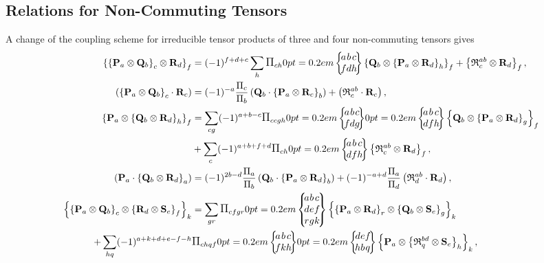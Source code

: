 \subsection{Relations for Non-Commuting Tensors}\label{sec:3.3.3}
A change of the coupling scheme for irreducible tensor products of three and four non-commuting tensors gives
\begin{align}
\left\{\left\{\vect{P}_{a} \otimes \vect{Q}_{b}\right\}_{c} \otimes \vect{R}_{d}\right\}_{f}&=(-1)^{f+d+c} \sum_{h} \Fact{c h}\sixj{a }{ b }{ c }{f }{ d }{ h}\left\{\vect{Q}_{b} \otimes\left\{\vect{P}_{a} \otimes \vect{R}_{d}\right\}_{h}\right\}_{f}+\left\{\mathfrak{R}_{c}^{a b} \otimes \vect{R}_{d}\right\}_{f},  \label{eq:3:3:16}\\
 \left(\left\{\vect{P}_{a} \otimes \vect{Q}_{b}\right\}_{c} \cdot \vect{R}_{c}\right)&=(-1)^{-a} \frac{\Fact{c}}{\Fact{b}}\left(\vect{Q}_{b} \cdot\left\{\vect{P}_{a} \otimes \vect{R}_{c}\right\}_{b}\right)+\left(\mathfrak{R}_{c}^{a b} \cdot \vect{R}_{c}\right),  \label{eq:3:3:17}\\
 \left\{\vect{P}_{a} \otimes\left\{\vect{Q}_{b} \otimes \vect{R}_{d}\right\}_{h}\right\}_{f}&=\sum_{c g}(-1)^{a+b-c} \Fact{c c g h}\sixj{a }{ b }{ c }{f }{ d }{ g}\sixj{a }{ b }{ c }{d }{ f }{ h}\left\{\vect{Q}_{b} \otimes\left\{\vect{P}_{a} \otimes \vect{R}_{d}\right\}_{g}\right\}_{f}  \notag\\
& +\sum_{c}(-1)^{a+b+f+d} \Fact{c h}\sixj{a }{ b }{ c }{d }{ f }{ h}\left\{\mathfrak{R}_{c}^{a b} \otimes \vect{R}_{d}\right\}_{f},  \label{eq:3:3:18}\\
\left(\vect{P}_{a} \cdot\left\{\vect{Q}_{b} \otimes \vect{R}_{d}\right\}_{a}\right)&=(-1)^{2 b-d} \frac{\Fact{a}}{\Fact{b}}\left(\vect{Q}_{b} \cdot\left\{\vect{P}_{a} \otimes \vect{R}_{d}\right\}_{b}\right)+(-1)^{-a+d} \frac{\Fact{a}}{\Fact{d}}\left(\mathfrak{R}_{d}^{a b} \cdot \vect{R}_{d}\right),  \label{eq:3:3:19}\\
\left\{\left\{\vect{P}_{a} \otimes \vect{Q}_{b}\right\}_{c} \otimes\left\{\vect{R}_{d} \otimes \vect{S}_{e}\right\}_{f}\right\}_{k}&=\sum_{g r} \Fact{c f g r}\ninej{a }{ b }{ c }{d }{ e }{ f }{r }{ g }{ k}\left\{\left\{\vect{P}_{a} \otimes \vect{R}_{d}\right\}_{r} \otimes\left\{\vect{Q}_{b} \otimes \vect{S}_{e}\right\}_{g}\right\}_{k}  \notag\\
 +\sum_{h q}(-1)^{a+k+d+e-f-h} &\Fact{c h q f}\sixj{a }{ b }{ c }{f }{ k }{ h}\sixj{d }{ e }{ f }{h }{ b }{ q}\left\{\vect{P}_{a} \otimes\left\{\mathfrak{R}_{q}^{b d} \otimes \vect{S}_{e}\right\}_{h}\right\}_{k},  \label{eq:3:3:20}\\

\end{align}
